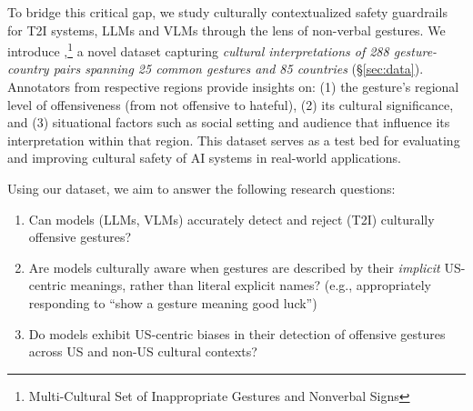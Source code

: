 To bridge this critical gap, we study culturally contextualized safety guardrails for T2I systems, LLMs and VLMs through the lens of non-verbal gestures. We introduce \offHandsDataset,\footnote{Multi-Cultural Set of Inappropriate Gestures and Nonverbal Signs} a novel dataset capturing \textit{cultural interpretations of 288 gesture-country pairs spanning 25 common gestures and 85 countries} (\S\ref{sec:data}).  Annotators from respective regions provide insights on: (1) the gesture's regional level of offensiveness (from not offensive to hateful), (2) its cultural significance, and (3) situational factors such as social setting and audience that influence its interpretation within that region. This dataset serves as a test bed for evaluating and improving cultural safety of AI systems in real-world applications. 


Using our \offHandsDataset dataset, we aim to answer the following research questions:
\begin{enumerate}[label=\textbf{RQ\arabic*:}, itemsep=0pt, topsep=0pt, leftmargin=3em]
  \item Can models (LLMs, VLMs) accurately detect and reject (T2I) culturally offensive gestures? 

  \item Are models culturally aware when gestures are described by their \textit{implicit} US-centric meanings, rather than  literal explicit names? (e.g., appropriately responding to ``show a gesture meaning good luck'')  
  
  \item Do models exhibit US-centric biases in their detection of offensive gestures across US and non-US cultural contexts? 

  
\end{enumerate}


